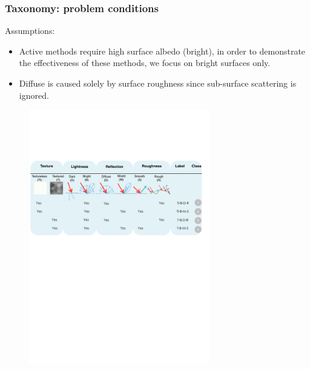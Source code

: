 \documentclass{beamer}
\begin{document}
\begin{frame}
\frametitle{Taxonomy: problem conditions}

Assumptions:
\begin{itemize}
\item Active methods require high surface albedo (bright), in order to demonstrate the effectiveness of these methods, we focus on bright surfaces only.
\item Diffuse is caused solely by surface roughness since sub-surface scattering is ignored.
\end{itemize}

\begin{figure}[h]
\includegraphics[width=0.7\textwidth]{taxo/prob_cond}
\end{figure}

\end{frame}

\end{document}

